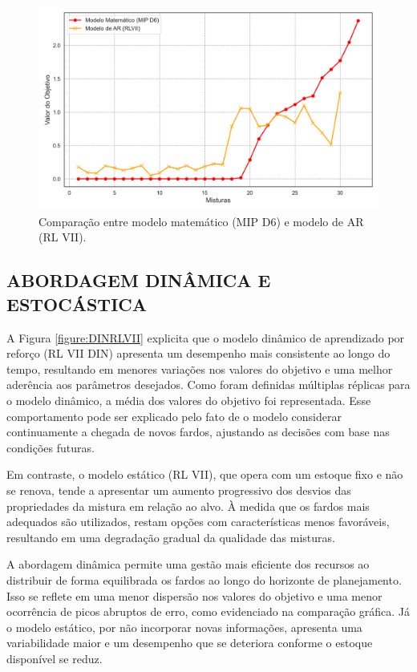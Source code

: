 \documentclass[
    12pt,                %
    openright,           %
    oneside,             %
    a4paper,             %
    english,             %
    spanish,             %
    brazil               %
]{ufscar}
\begin{document}
\begin{figure}[hbt]
\centering
  \caption{Comparação entre modelo matemático (MIP D6) e modelo de AR (RL VII).}
  \label{figure:ModeloMatematicoRLVII}
  \includegraphics[width=1\textwidth]{figures/ModeloMatematicoRLVII.png}
\end{figure}

\subsection{ABORDAGEM DINÂMICA E ESTOCÁSTICA}

A Figura \ref{figure:DINRLVII} explicita que o modelo dinâmico de aprendizado por reforço (RL VII DIN) apresenta um desempenho mais consistente ao longo do tempo, resultando em menores variações nos valores do objetivo e uma melhor aderência aos parâmetros desejados. Como foram definidas múltiplas réplicas para o modelo dinâmico, a média dos valores do objetivo foi representada. Esse comportamento pode ser explicado pelo fato de o modelo considerar continuamente a chegada de novos fardos, ajustando as decisões com base nas condições futuras.

Em contraste, o modelo estático (RL VII), que opera com um estoque fixo e não se renova, tende a apresentar um aumento progressivo dos desvios das propriedades da mistura em relação ao alvo. À medida que os fardos mais adequados são utilizados, restam opções com características menos favoráveis, resultando em uma degradação gradual da qualidade das misturas.

A abordagem dinâmica permite uma gestão mais eficiente dos recursos ao distribuir de forma equilibrada os fardos ao longo do horizonte de planejamento. Isso se reflete em uma menor dispersão nos valores do objetivo e uma menor ocorrência de picos abruptos de erro, como evidenciado na comparação gráfica. Já o modelo estático, por não incorporar novas informações, apresenta uma variabilidade maior e um desempenho que se deteriora conforme o estoque disponível se reduz.
\end{document}
